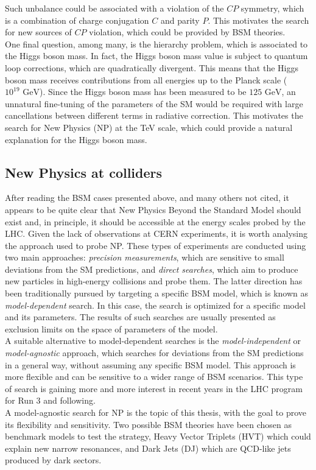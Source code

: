 Such unbalance could be associated with a violation of the $CP$ symmetry, which is a combination of charge conjugation $C$ and parity $P$. 
This motivates the search for new sources of $CP$ violation, which could be provided by BSM theories.\\
One final question, among many, is the hierarchy problem, which is associated to the Higgs boson mass. In fact, the Higgs boson mass  value is subject to quantum loop corrections, which are quadratically divergent. 
This means that the Higgs boson mass receives contributions from all energies up to the Planck scale ($10^{19} \text{ GeV}$). 
Since the Higgs boson mass has been measured to be $125 \text{ GeV}$, an unnatural fine-tuning of the parameters of the SM would be required with large cancellations between different terms in radiative correction. 
This motivates the search for New Physics (NP) at the TeV scale, which could provide a natural explanation for the Higgs boson mass.\\

\subsection{New Physics at colliders}\label{sec:SM_BSM/BSM/NP_coll}
After reading the BSM cases presented above, and many others not cited, it appears to be quite clear that New Physics Beyond the Standard Model should exist and, in principle, it should be accessible at the energy scales probed by the LHC. 
Given the lack of observations at CERN experiments, it is worth analysing the approach used to probe NP. These types of experiments are conducted using two main approaches: \textit{precision measurements}, which are sensitive to small deviations from the SM predictions, and \textit{direct searches}, which aim to produce new particles in high-energy collisions and probe them.
The latter direction has been traditionally pursued by targeting a specific BSM model, which is known as \textit{model-dependent} search. In this case, the search is optimized for a specific model and its parameters. The results of such searches are usually presented as exclusion limits on the space of parameters of the model.\\
A suitable alternative to model-dependent searches is the \textit{model-independent}  or \textit{model-agnostic} approach, which searches for deviations from the SM predictions in a general way, without assuming any specific BSM model. This approach is more flexible and can be sensitive to a wider range of BSM scenarios. This type of search is gaining more and more interest in recent years in the LHC program for Run 3 and following.\\ 
A model-agnostic search for NP is the topic of this thesis, with the goal to prove its flexibility and sensitivity. Two possible BSM theories have been chosen as benchmark models to test the strategy, Heavy Vector Triplets (HVT) which could explain new narrow resonances, and Dark Jets (DJ) which are QCD-like jets produced by dark sectors.

